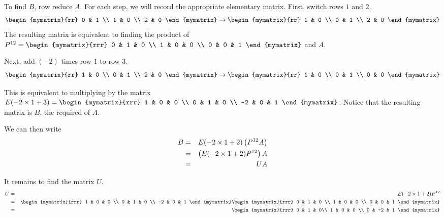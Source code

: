 \begin{solution}
To find $B$, row reduce $A$. For each step, we will record the appropriate elementary matrix. 
First, switch rows $1$ and $2$. 
\[
 \begin{mymatrix}{rr}
0 & 1 \\
1 & 0 \\
2 & 0
\end{mymatrix}
\rightarrow
\begin{mymatrix}{rr}
1 & 0 \\
0 & 1 \\
2 & 0
\end{mymatrix}
\]
The resulting matrix is equivalent to finding the product of 
$ P^{12} =\begin{mymatrix}{rrr}
0 & 1 & 0 \\
1 & 0 & 0 \\
0 & 0 & 1 
\end{mymatrix}$ and $A$. 

Next, add $(-2)$ times row $1$ to row $3$. 
\[
\begin{mymatrix}{rr}
1 & 0 \\
0 & 1 \\
2 & 0
\end{mymatrix}
\rightarrow
\begin{mymatrix}{rr}
1 & 0 \\
0 & 1 \\
0 & 0
\end{mymatrix}
\]

This is equivalent to multiplying by the matrix $E(-2 \times 1 + 3) = 
\begin{mymatrix}{rrr}
1 & 0 & 0 \\
0 & 1 & 0 \\
-2 & 0 & 1 
\end{mymatrix}$. Notice that the resulting matrix is $B$, the required {\rref} of $A$.

We can then write 
\begin{eqnarray*}
B &=& E(-2 \times 1 + 2) \left(P^{12} A \right) \\
&=& \left(E(-2 \times 1 + 2) P^{12} \right) A \\
&=& U A
\end{eqnarray*} 

It remains to find the matrix $U$. 
\begin{eqnarray*}
U &=& E(-2 \times 1 + 2) P^{12} \\
&=& \begin{mymatrix}{rrr}
1 & 0 & 0 \\
0 & 1 & 0 \\
-2 & 0 & 1 
\end{mymatrix}
\begin{mymatrix}{rrr}
0 & 1 & 0 \\
1 & 0 & 0 \\
0 & 0 & 1 
\end{mymatrix} \\
&=& \begin{mymatrix}{rrr}
0 & 1 & 0\\
1 & 0 & 0 \\
0 & -2  & 1 
\end{mymatrix}
\end{eqnarray*}



\end{solution}
